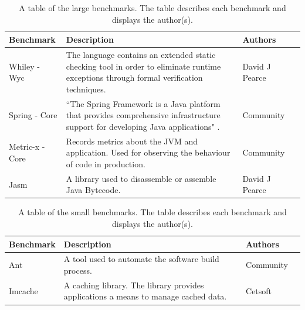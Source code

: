 \documentclass[11pt
              , a4paper
              , twoside
              , openright
              ]{report}
\begin{document}
\begin{table}[H]
\centering
\begin{tabular}{|l|l|l|l|}
\hline
{\bf Benchmark}       &  {\bf Description}  & {\bf Authors}   \\ \hline
Whiley - Wyc         &     \begin{minipage}[t]{0.6\columnwidth} The language contains an extended static checking tool in order to eliminate runtime exceptions through formal verification techniques. 
\end{minipage}     & David J Pearce          \\ \hline
Spring - Core   &  \begin{minipage}[t]{0.6\columnwidth} ``The Spring Framework is a Java platform that provides comprehensive infrastructure support for developing Java applications" \cite{spring} .
\end{minipage}       & Community \\ \hline
Metric-x - Core &     \begin{minipage}[t]{0.6\columnwidth} Records metrics about the JVM and application. Used for observing the behaviour of code in production.
\end{minipage}        & Community \\ \hline
Jasm              &     \begin{minipage}[t]{0.6\columnwidth} A library used to disassemble or assemble Java Bytecode. 
\end{minipage}          & David J Pearce \\ \hline

\end{tabular}
\caption{A table of the large benchmarks. The table describes each benchmark and displays the author(s).}
\label{large_testdes}
\end{table}

\begin{table}[H]
\centering
\begin{tabular}{|l|l|l|l|}
\hline
{\bf Benchmark}   & {\bf Description}  & {\bf Authors}  \\ \hline
Ant             &    \begin{minipage}[t]{0.6\columnwidth} A tool used to automate the software build process. 
\end{minipage}  & Community \\ \hline
Imcache &      \begin{minipage}[t]{0.6\columnwidth} A caching library. The library provides applications a means to manage cached data. 
\end{minipage}     & Cetsoft \\ \hline
\end{tabular}
\caption{A table of the small benchmarks. The table describes each benchmark and displays the author(s).}
\label{small_testdes}
\end{table}
\end{document}
